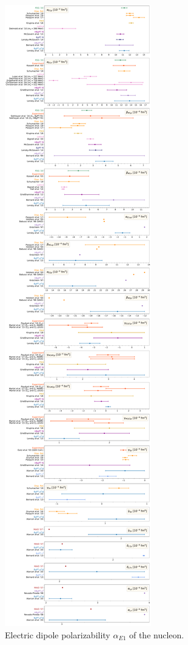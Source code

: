 \documentclass[preprints,review,accept,moreauthors,pdftex]{Definitions/mdpi}
\def\al{\alpha}
\begin{document}
\begin{figure}[t]
\centering
\includegraphics[width=\columnwidth]{Figures/alphaE1Pol.pdf}
\caption{Electric dipole polarizability $\al_{E1}$ of the nucleon. \label{alphaE1Pol}}
\end{figure} 
\end{document}
